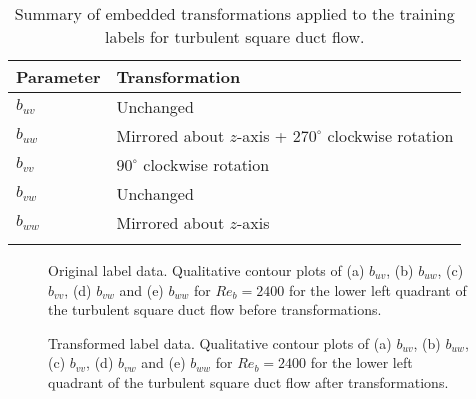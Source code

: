 \documentclass[11pt]{article}
\numberwithin{equation}{section}
\theoremstyle{plain}
\theoremstyle{definition}
\begin{document}
\begin{table}[!ht]
\caption{Summary of embedded transformations applied to the training labels for turbulent square duct flow.}
\centering

\begin{tabular}{ll}
\toprule
Parameter & Transformation                                  \\\midrule
$b_{uv}$     & Unchanged                                       \\
$b_{uw}$    & Mirrored about $z$-axis + $270^{\circ}$ clockwise rotation \\
$b_{vv}$     & $90^{\circ}$ clockwise rotation                \\
$b_{vw}$    & Unchanged                                       \\
$b_{ww}$    & Mirrored about $z$-axis \\
\bottomrule   
\label{tab: transformation}
\end{tabular}
\end{table}

\begin{figure}[!ht]
\centering
{}
\caption{Original label data. Qualitative contour plots of (a) $b_{uv}$, (b) $b_{uw}$, (c) $b_{vv}$, (d) $b_{vw}$ and (e) $b_{ww}$ for $Re_{b}=2400$ for the lower left quadrant of the turbulent square duct flow before transformations.}
\label{fig:b_uv and b_uw}
\end{figure}

\begin{figure}[!ht]
\centering
{}
\caption{Transformed label data. Qualitative contour plots of (a) $b_{uv}$, (b) $b_{uw}$, (c) $b_{vv}$, (d) $b_{vw}$ and (e) $b_{ww}$ for $Re_{b}=2400$ for the lower left quadrant of the turbulent square duct flow after transformations.}
\label{fig:b_uv and b_uw_transformed}
\end{figure}
\end{document}
